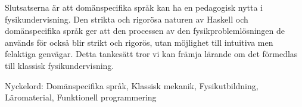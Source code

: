 \begin{binge}
Slutsatserna är att
domänspecifika språk kan ha en pedagogisk nytta i
fysikundervisning. Den strikta och
rigorösa naturen av Haskell och domänspecifika språk ger att den
processen av den fysikproblemlösningen de används för också blir
strikt och rigorös, utan möjlighet till intuitiva men felaktiga
genvägar. Detta tankesätt tror vi kan främja lärande om det förmedlas
till klassisk fysikundervisning.

\vfill
Nyckelord: Domänspecifika språk, Klassisk mekanik, Fysikutbildning, Läromaterial, Funktionell programmering

\end{binge}

\newpage				%
\thispagestyle{empty}
\mbox{}

